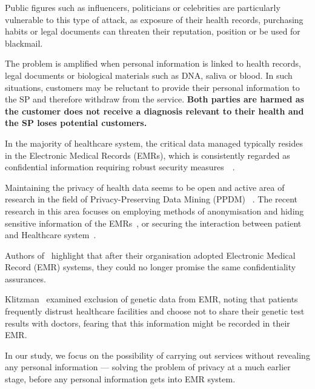 \documentclass[pdftex,twocolumn,epjc3]{svjour3}
\begin{document}
Public figures such as influencers, politicians or celebrities are particularly vulnerable to this type of attack, as exposure of their health records, purchasing habits or legal documents can threaten their reputation, position or be used for blackmail.

The problem is amplified when personal information is linked to health records, legal documents or biological materials such as DNA, saliva or blood. In such situations, customers may be reluctant to provide their personal information to the SP and therefore withdraw from the service.  \textbf{Both parties are harmed as the customer does not receive a diagnosis relevant to their health and the SP loses potential customers.}~\cite{klitzmanExclusionGeneticInformation2010,blackPresymptomaticTestingConfidentiality2021}

In the majority of healthcare system, the critical data managed typically resides in the Electronic Medical Records (EMRs), which is consistently regarded as confidential information requiring robust security measures~\cite{jinReviewSecurePrivacypreserving2019}~\cite{keshtaSecurityPrivacyElectronic2021}. 

Maintaining the privacy of health data seems to be open and active area of research in the field of Privacy-Preserving Data Mining (PPDM) ~\cite{nareshPrivacyPreservingData2023,linPPSFOpensourcePrivacypreserving2018,hewagePrivacypreservingDataStream2023}. The recent research in this area focuses on employing methods of anonymisation and hiding sensitive information of the EMRs~\cite{hamdiEnhancingSecurityPrivacy2023, sharmaPrivacyPreservingData2019, wuHidingSensitiveInformation2021}, or securing the interaction between patient and Healthcare system~\cite{zhangPrivacyProtectionTelecare2016, mehmoodAnonymousAuthenticationScheme2018, khasimImprovedFastSecure2022}.

Authors of~\cite{blackPresymptomaticTestingConfidentiality2021} highlight that after their organisation adopted Electronic Medical Record (EMR) systems, they could no longer promise the same confidentiality assurances.

Klitzman~\cite{klitzmanExclusionGeneticInformation2010} examined exclusion of genetic data from EMR, noting that patients frequently distrust healthcare facilities and choose not to share their genetic test results with doctors, fearing that this information might be recorded in their EMR.
 
In our study, we focus on the possibility of carrying out services without revealing any personal information — solving the problem of privacy at a much earlier stage, before any personal information gets into EMR system.
\end{document}
